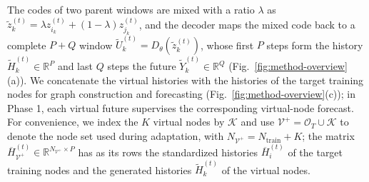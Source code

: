 \documentclass[runningheads,a4paper]{llncs}
\begin{document}
The codes of two parent windows are mixed with a ratio $\lambda$ as $\widetilde z_k^{(t)}=\lambda z_{i_k}^{(t)}+(1-\lambda)z_{j_k}^{(t)}$, and the decoder maps the mixed code back to a complete $P+Q$ window $\widetilde U_k^{(t)}=D_\theta(\widetilde z_k^{(t)})$, whose first $P$ steps form the history $\widetilde H_k^{(t)}\in\mathbb R^P$ and last $Q$ steps the future $\widetilde Y_k^{(t)}\in\mathbb R^Q$ (Fig.~\ref{fig:method-overview}(a)). We concatenate the virtual histories with the histories of the target training nodes for graph construction and forecasting (Fig.~\ref{fig:method-overview}(c)); in Phase 1, each virtual future supervises the corresponding virtual-node forecast. For convenience, we index the $K$ virtual nodes by $\mathcal K$ and use $\mathcal V^{+}=\mathcal O_T\cup\mathcal K$ to denote the node set used during adaptation, with $N_{\mathcal V^{+}}=N_{\mathrm{train}}+K$; the matrix $\overline H_{\mathcal V^{+}}^{(t)}\in\mathbb R^{N_{\mathcal V^{+}}\times P}$ has as its rows the standardized histories $\overline H_i^{(t)}$ of the target training nodes and the generated histories $\widetilde H_k^{(t)}$ of the virtual nodes.
\end{document}
